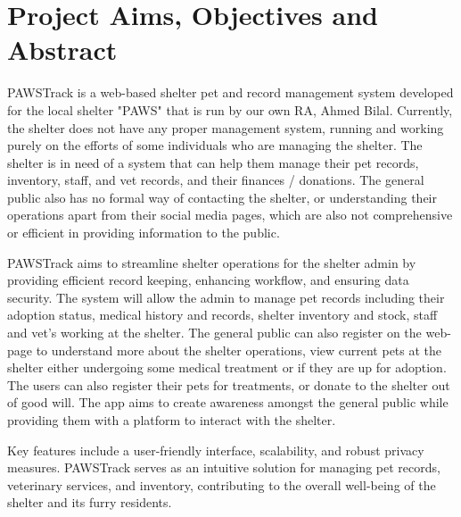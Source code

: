 \section{Project Aims, Objectives and Abstract}
PAWSTrack is a web-based shelter pet and record management system developed for the local shelter "PAWS" that is run by our own RA, Ahmed Bilal. Currently, the shelter does not have any proper management system, running and working purely on the efforts of some individuals who are managing the shelter. The shelter is in need of a system that can help them manage their pet records, inventory, staff, and vet records, and their finances / donations. The general public also has no formal way of contacting the shelter, or understanding their operations apart from their social media pages, which are also not comprehensive or efficient in providing information to the public.

PAWSTrack aims to streamline shelter operations for the shelter admin by providing efficient record keeping, enhancing workflow, and ensuring data security. The system will allow the admin to manage pet records including their adoption status, medical history and records, shelter inventory and stock, staff and vet's working at the shelter. The general public can also register on the web-page to understand more about the shelter operations, view current pets at the shelter either undergoing some medical treatment or if they are up for adoption. The users can also register their pets for treatments, or donate to the shelter out of good will. The app aims to create awareness amongst the general public while providing them with a platform to interact with the shelter. 

Key features include a user-friendly interface, scalability, and robust privacy measures. PAWSTrack serves as an intuitive solution for managing pet records, veterinary services, and inventory, contributing to the overall well-being of the shelter and its furry residents.